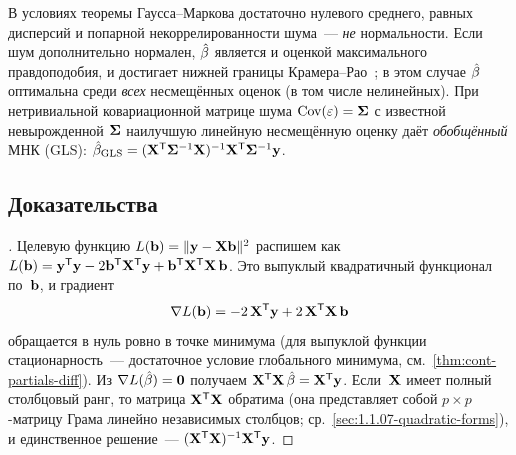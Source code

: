 \begin{remark}
В условиях теоремы Гаусса--Маркова достаточно нулевого среднего, равных дисперсий и попарной некоррелированности шума~--- \emph{не} нормальности. Если шум дополнительно нормален, $\hat{\mathbf{\beta}}$ является и оценкой максимального правдоподобия, и достигает нижней границы Крамера--Рао~\cite[гл.~VII, \S~6]{Shiryaev1989}; в этом случае $\hat{\mathbf{\beta}}$ оптимальна среди \emph{всех} несмещённых оценок (в том числе нелинейных). При нетривиальной ковариационной матрице шума $\operatorname{Cov}(\mathbf{\varepsilon}) = \mathbf{\Sigma}$ с известной невырожденной $\mathbf{\Sigma}$ наилучшую линейную несмещённую оценку даёт \emph{обобщённый} МНК (GLS): $\hat{\mathbf{\beta}}_{\mathrm{GLS}} = (\mathbf{X}^{\mathsf{T}} \mathbf{\Sigma}^{-1} \mathbf{X})^{-1} \mathbf{X}^{\mathsf{T}} \mathbf{\Sigma}^{-1} \mathbf{y}$.
\end{remark}

\subsection*{Доказательства}

\begin{proof}[]
Целевую функцию $L(\mathbf{b}) = \|\mathbf{y} - \mathbf{X} \mathbf{b}\|^2$ распишем как $L(\mathbf{b}) = \mathbf{y}^{\mathsf{T}} \mathbf{y} - 2 \mathbf{b}^{\mathsf{T}} \mathbf{X}^{\mathsf{T}} \mathbf{y} + \mathbf{b}^{\mathsf{T}} \mathbf{X}^{\mathsf{T}} \mathbf{X}\, \mathbf{b}$. Это выпуклый квадратичный функционал по~$\mathbf{b}$, и градиент
\[
  \nabla L(\mathbf{b}) = -2\, \mathbf{X}^{\mathsf{T}} \mathbf{y} + 2\, \mathbf{X}^{\mathsf{T}} \mathbf{X}\, \mathbf{b}
\]
обращается в нуль ровно в точке минимума (для выпуклой функции стационарность~--- достаточное условие глобального минимума, см.~\cref{thm:cont-partials-diff}). Из $\nabla L(\hat{\mathbf{\beta}}) = \mathbf{0}$ получаем $\mathbf{X}^{\mathsf{T}} \mathbf{X}\, \hat{\mathbf{\beta}} = \mathbf{X}^{\mathsf{T}} \mathbf{y}$. Если~$\mathbf{X}$ имеет полный столбцовый ранг, то матрица $\mathbf{X}^{\mathsf{T}} \mathbf{X}$ обратима (она представляет собой $p \times p$-матрицу Грама линейно независимых столбцов; ср.~\cref{sec:1.1.07-quadratic-forms}), и единственное решение~--- $(\mathbf{X}^{\mathsf{T}} \mathbf{X})^{-1} \mathbf{X}^{\mathsf{T}} \mathbf{y}$.
\end{proof}

